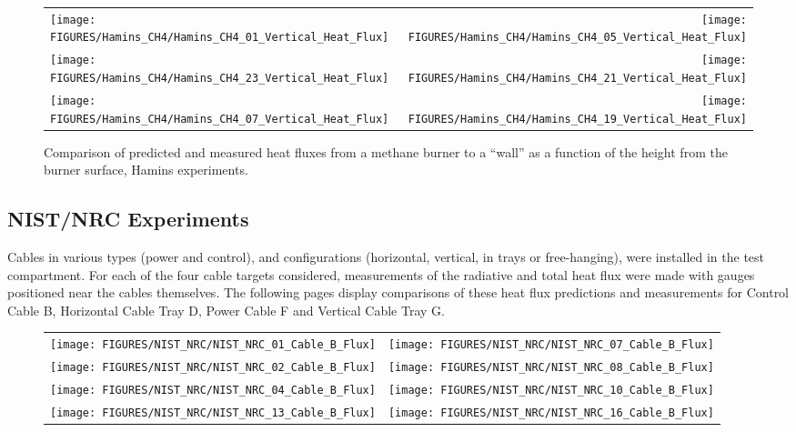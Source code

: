 \begin{figure}[p]
\begin{tabular*}{\textwidth}{l@{\extracolsep{\fill}}r}
\texttt{[image: FIGURES/Hamins\_CH4/Hamins\_CH4\_01\_Vertical\_Heat\_Flux]} &
\texttt{[image: FIGURES/Hamins\_CH4/Hamins\_CH4\_05\_Vertical\_Heat\_Flux]} \\
\texttt{[image: FIGURES/Hamins\_CH4/Hamins\_CH4\_23\_Vertical\_Heat\_Flux]} &
\texttt{[image: FIGURES/Hamins\_CH4/Hamins\_CH4\_21\_Vertical\_Heat\_Flux]} \\
\texttt{[image: FIGURES/Hamins\_CH4/Hamins\_CH4\_07\_Vertical\_Heat\_Flux]} &
\texttt{[image: FIGURES/Hamins\_CH4/Hamins\_CH4\_19\_Vertical\_Heat\_Flux]}
\end{tabular*}
\label{Hamins_CH4_Vertical}
\caption[Vertical heat flux predictions, Hamins methane burner experiments.]
{Comparison of predicted and measured heat fluxes from a methane burner to a ``wall'' as a function of the height from the burner surface, Hamins experiments.}
\end{figure}



\clearpage


\subsection{NIST/NRC Experiments}

Cables in various types (power and control), and configurations (horizontal, vertical, in trays or free-hanging), were installed in
the test compartment. For each of the four cable targets considered, measurements of the radiative and total heat flux were made with
gauges positioned near the cables themselves.  The following pages display comparisons of these heat flux predictions and measurements for
Control Cable B, Horizontal Cable Tray D, Power Cable F and Vertical Cable Tray G.

\newpage

\begin{figure}[p]
\begin{tabular*}{\textwidth}{l@{\extracolsep{\fill}}r}
\texttt{[image: FIGURES/NIST\_NRC/NIST\_NRC\_01\_Cable\_B\_Flux]} &
\texttt{[image: FIGURES/NIST\_NRC/NIST\_NRC\_07\_Cable\_B\_Flux]} \\
\texttt{[image: FIGURES/NIST\_NRC/NIST\_NRC\_02\_Cable\_B\_Flux]} &
\texttt{[image: FIGURES/NIST\_NRC/NIST\_NRC\_08\_Cable\_B\_Flux]} \\
\texttt{[image: FIGURES/NIST\_NRC/NIST\_NRC\_04\_Cable\_B\_Flux]} &
\texttt{[image: FIGURES/NIST\_NRC/NIST\_NRC\_10\_Cable\_B\_Flux]} \\
\texttt{[image: FIGURES/NIST\_NRC/NIST\_NRC\_13\_Cable\_B\_Flux]} &
\texttt{[image: FIGURES/NIST\_NRC/NIST\_NRC\_16\_Cable\_B\_Flux]}
\end{tabular*}
\label{NIST_NRC_Cable_B_Flux_Closed}
\end{figure}

